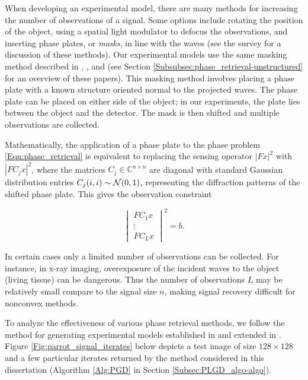 When developing an experimental model, there are many methods for increasing the number of observations of a signal.  Some options include rotating the position of the object, using a spatial light modulator to defocus the observations, and inserting phase plates, or \textit{masks}, in line with the waves (see the survey \cite{duadi2011digital} for a discussion of these methods).  Our experimental models use the same masking method described in \cite[Section 2]{DBLP:journals/siamis/CandesESV13}, \cite[Sections 4.2, 4.3]{DBLP:journals/tit/CandesLS15}, and \cite[Section 5.1]{DBLP:journals/siamsc/FriedlanderM16} (see Section \ref{Subsubsec:phase_retrieval-unstructured} for an overview of these papers).  This masking method involves placing a phase plate with a known structure oriented normal to the projected waves.  The phase plate can be placed on either side of the object; in our experiments, the plate lies between the object and the detector.  The mask is then shifted and multiple observations are collected.




Mathematically, the application of a phase plate to the phase problem \ref{Eqn:phase_retrieval} is equivalent to replacing the sensing operator $|Fx|^2$ with $|FC_jx|^2$, where the matrices $C_j \in \mathbb{C}^{n \times n}$ are diagonal with standard Gaussian distribution entries $C_j(i,i) \sim {\mathcal N}(0, 1)$, representing the diffraction patterns of the shifted phase plate.  This gives the observation constraint

\begin{equation}		\label{Eqn:FCx}
	\begin{vmatrix}
		FC_1x \\ \vdots \\ FC_Lx
	\end{vmatrix}^2
	= b.
\end{equation}

In certain cases only a limited number of observations can be collected.  For instance, in x-ray imaging, overexposure of the incident waves to the object (living tissue) can be dangerous.  Thus the number of observations $L$ may be relatively small compare to the signal size $n$, making signal recovery difficult for nonconvex methods.




To analyze the effectiveness of various phase retrieval methods, we follow the method for generating experimental models established in \cite{DBLP:journals/tit/CandesLS15} and extended in \cite{DBLP:journals/siamsc/FriedlanderM16}.  Figure \ref{Fig:parrot_signal_iterates} below depicts a test image of size $128 \times 128$ and a few particular iterates returned by the method considered in this dissertation (Algorithm \ref{Alg:PGD} in Section \ref{Subsec:PLGD_algo-algo}).  

